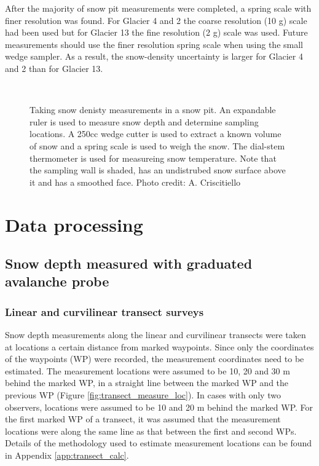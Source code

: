 \documentclass{sfuthesis}
\begin{document}
After the majority of snow pit measurements were completed, a spring scale with finer resolution was found. For Glacier 4 and 2 the coarse resolution (10 g) scale had been used but for Glacier 13 the fine resolution (2 g) scale was used. Future measurements should use the finer resolution spring scale when using the small wedge sampler. As a result, the snow-density uncertainty is larger for Glacier 4 and 2 than for Glacier 13. 

\begin{figure}
	\centering
	\\
	\caption{Taking snow denisty measurements in a snow pit. An expandable ruler is used to measure snow depth and determine sampling locations. A 250cc wedge cutter is used to extract a known volume of snow and a spring scale is used to weigh the snow. The dial-stem thermometer is used for measureing snow temperature. Note that the sampling wall is shaded, has an undistrubed snow surface above it and has a smoothed face. Photo credit: A. Criscitiello}
	\label{photo_snowpit}
	\end{figure}

\section{Data processing}
\subsection{Snow depth measured with graduated avalanche probe}

\subsubsection{Linear and curvilinear transect surveys}

Snow depth measurements along the linear and curvilinear transects were taken at locations a certain distance from marked waypoints. Since only the coordinates of the waypoints (WP) were recorded, the measurement coordinates need to be estimated. The measurement locations were assumed to be 10, 20 and 30 m behind the marked WP, in a straight line between the marked WP and the previous WP (Figure \ref{fig:transect_measure_loc}). In cases with only two observers, locations were assumed to be 10 and 20 m behind the marked WP. For the first marked WP of a transect, it was assumed that the measurement locations were along the same line as that between the first and second WPs. Details of the methodology used to estimate measurement locations can be found in Appendix \ref{app:transect_calc}.
\end{document}
